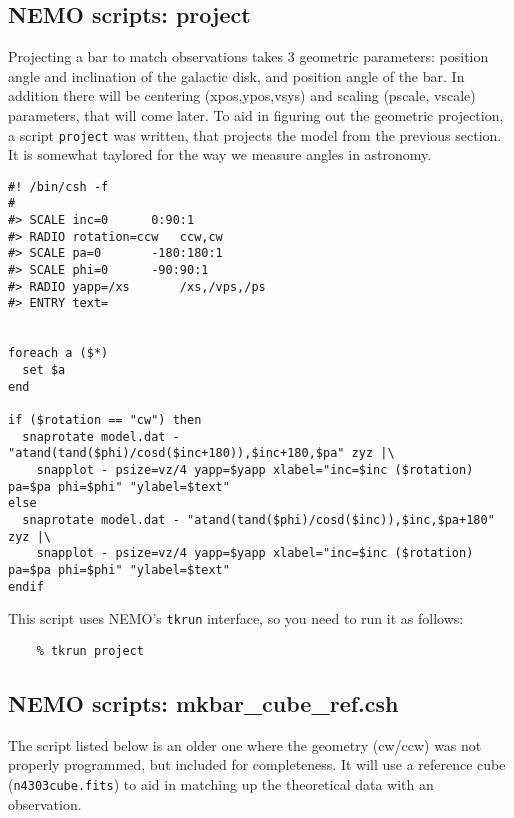 \documentclass[11pt]{article}
\begin{document}
\subsection{NEMO scripts: project}
 
Projecting a bar to match observations takes 3 geometric parameters:
position angle and inclination of the galactic disk, and position
angle of the bar. In addition there will be centering (xpos,ypos,vsys)
and scaling (pscale, vscale) parameters, that will come later. To
aid in figuring out the geometric projection, a script {\tt project}
was written, that projects the model from the previous section. It
is somewhat taylored for the way we measure angles in astronomy.

\footnotesize\begin{verbatim}
#! /bin/csh -f 
#
#> SCALE inc=0		0:90:1
#> RADIO rotation=ccw   ccw,cw
#> SCALE pa=0		-180:180:1
#> SCALE phi=0		-90:90:1
#> RADIO yapp=/xs       /xs,/vps,/ps
#> ENTRY text=  


foreach a ($*)
  set $a
end

if ($rotation == "cw") then
  snaprotate model.dat - "atand(tand($phi)/cosd($inc+180)),$inc+180,$pa" zyz |\
    snapplot - psize=vz/4 yapp=$yapp xlabel="inc=$inc ($rotation) pa=$pa phi=$phi" "ylabel=$text"
else
  snaprotate model.dat - "atand(tand($phi)/cosd($inc)),$inc,$pa+180" zyz |\
    snapplot - psize=vz/4 yapp=$yapp xlabel="inc=$inc ($rotation) pa=$pa phi=$phi" "ylabel=$text"
endif

\end{verbatim}\normalsize

This script uses NEMO's {\tt tkrun} interface, so you need to run it
as follows:

\footnotesize\begin{verbatim}
    % tkrun project
\end{verbatim}\normalsize

\subsection{NEMO scripts: mkbar\_cube\_ref.csh}

The script listed below is an older one where the geometry (cw/ccw) was not 
properly programmed, but included for completeness. It will use a reference
cube ({\tt n4303cube.fits}) to aid in matching up the theoretical data with
an observation.
\end{document}
